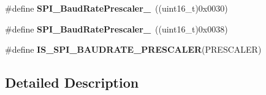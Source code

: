 \begin{DoxyCompactItemize}
\item 
\hypertarget{group___s_p_i___baud_rate___prescaler_gafa6c39c3ee16a08730356a5cd30f3648}{\#define {\bfseries S\-P\-I\-\_\-\-Baud\-Rate\-Prescaler\-\_}~((uint16\-\_\-t)0x0030)}\label{group___s_p_i___baud_rate___prescaler_gafa6c39c3ee16a08730356a5cd30f3648}

\item 
\hypertarget{group___s_p_i___baud_rate___prescaler_ga1e1aa6406f0e88ac557ba49fb8069e3e}{\#define {\bfseries S\-P\-I\-\_\-\-Baud\-Rate\-Prescaler\-\_}~((uint16\-\_\-t)0x0038)}\label{group___s_p_i___baud_rate___prescaler_ga1e1aa6406f0e88ac557ba49fb8069e3e}

\item 
\#define {\bfseries I\-S\-\_\-\-S\-P\-I\-\_\-\-B\-A\-U\-D\-R\-A\-T\-E\-\_\-\-P\-R\-E\-S\-C\-A\-L\-E\-R}(P\-R\-E\-S\-C\-A\-L\-E\-R)
\end{DoxyCompactItemize}


\subsection{Detailed Description}



